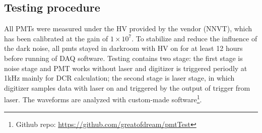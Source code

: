 \subsection{Testing procedure}
All PMTs were measured under the HV provided by the vendor (NNVT), which has been calibrated at the gain of $1\times10^7$. To stabilize and reduce the influence of the dark noise, all pmts stayed in darkroom with HV on for at least 12 hours before running of DAQ software. Testing contains two stage: the first stage is noise stage and PMT works without laser and digitizer is triggered periodly at 1kHz mainly for DCR calculation; the second stage is laser stage, in which digitizer samples data with laser on and triggered by the output of trigger from laser. The waveforms are analyzed with custom-made software\footnote{Github repo: \url{https://github.com/greatofdream/pmtTest}}.